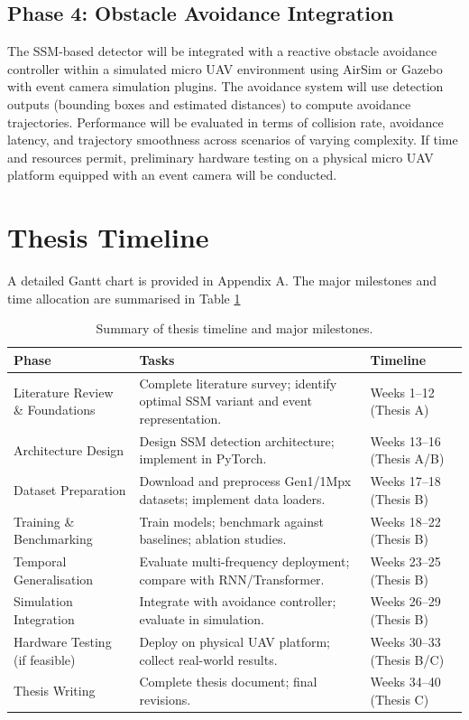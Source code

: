\documentclass[11pt, a4paper]{report}
\begin{document}
\subsection{Phase 4: Obstacle Avoidance Integration}
The SSM-based detector will be integrated with a reactive obstacle avoidance controller within a simulated micro UAV environment using AirSim or Gazebo with event camera simulation plugins. The avoidance system will use detection outputs (bounding boxes and estimated distances) to compute avoidance trajectories. Performance will be evaluated in terms of collision rate, avoidance latency, and trajectory smoothness across scenarios of varying complexity. If time and resources permit, preliminary hardware testing on a physical micro UAV platform equipped with an event camera will be conducted.  

\newpage

\section{Thesis Timeline}
A detailed Gantt chart is provided in Appendix A. The major milestones and time allocation are summarised in Table \ref{tab:timeline}

\begin{table}[ht]
    \centering
    \caption{Summary of thesis timeline and major milestones.}
    \label{tab:timeline}
    \renewcommand{\arraystretch}{1.4} %
    \begin{tabularx}{\textwidth}{|l|X|l|}
        \hline
        \rowcolor[gray]{0.9} \textbf{Phase} & \textbf{Tasks} & \textbf{Timeline} \\ \hline
        Literature Review \& Foundations & Complete literature survey; identify optimal SSM variant and event representation. & Weeks 1--12 (Thesis A)  \\ \hline
        Architecture Design & Design SSM detection architecture; implement in PyTorch. & Weeks 13--16 (Thesis A/B)  \\ \hline
        Dataset Preparation & Download and preprocess Gen1/1Mpx datasets; implement data loaders. & Weeks 17--18 (Thesis B) \\ \hline
        Training \& Benchmarking & Train models; benchmark against baselines; ablation studies. & Weeks 18--22 (Thesis B)  \\ \hline
        Temporal Generalisation & Evaluate multi-frequency deployment; compare with RNN/Transformer. & Weeks 23--25  (Thesis B)\\ \hline
        Simulation Integration & Integrate with avoidance controller; evaluate in simulation. & Weeks 26--29  (Thesis B)\\ \hline
        Hardware Testing (if feasible) & Deploy on physical UAV platform; collect real-world results. & Weeks 30--33  (Thesis B/C)\\ \hline
        Thesis Writing & Complete thesis document; final revisions. & Weeks 34--40 (Thesis C)  \\ \hline
    \end{tabularx}
\end{table}
\end{document}

